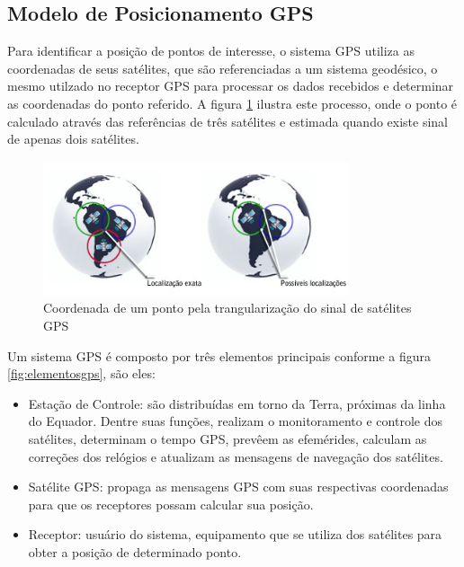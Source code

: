 \subsection{Modelo de Posicionamento GPS}

Para identificar a posição de pontos de interesse, o sistema GPS utiliza as coordenadas de seus satélites, que são referenciadas a um sistema geodésico, o mesmo utilzado no receptor GPS para processar os dados recebidos e determinar as coordenadas do ponto referido. A figura \ref{fig:coordenadagps} ilustra este processo, onde o ponto é calculado através das referências de três satélites e estimada quando existe sinal de apenas dois satélites.

\begin{figure}[h!]
			\centering
			\includegraphics[width=0.8\textwidth]{figures/triangGPS.jpg}
			\caption{Coordenada de um ponto pela trangulariza\c{c}\~{a}o do sinal de sat\'{e}lites GPS}
			\label{fig:coordenadagps}
\end{figure}

Um sistema GPS é composto por três elementos principais conforme a figura \ref{fig:elementosgps}, são eles:

\begin{itemize}
	\item Estação de Controle: são distribuídas em torno da Terra, próximas da linha do Equador. Dentre suas funções, realizam o monitoramento e controle dos satélites, determinam o tempo GPS, prevêem as efemérides, calculam as correções dos relógios e atualizam as mensagens de navegação dos satélites.
	\item Satélite GPS: propaga as mensagens GPS com suas respectivas coordenadas para que os receptores possam calcular sua posição.
	\item Receptor: usuário do sistema, equipamento que se utiliza dos satélites para obter a posição de determinado ponto.	
\end{itemize}


